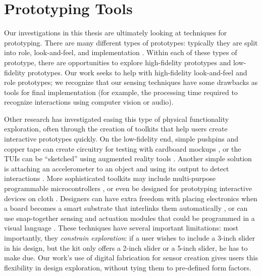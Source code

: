 \section{Prototyping Tools}

    Our investigations in this thesis are ultimately looking at techniques for prototyping. There are many different types of prototypes: typically they are split into role, look-and-feel, and implementation \cite{houde-prototypes}. Within each of these types of prototype, there are opportunities to explore high-fidelity prototypes and low-fidelity prototypes. Our work seeks to help with high-fidelity look-and-feel and role prototypes; we recognize that our sensing techniques have some drawbacks as tools for final implementation (for example, the processing time required to recognize interactions using computer vision or audio).

    Other research has investigated easing this type of physical functionality exploration, often through the creation of toolkits that help users create interactive prototypes quickly. On the low-fidelity end, simple pushpins and copper tape can create circuitry for testing with cardboard mockups \cite{hudson-boxes}, or the TUIs can be ``sketched'' using augmented reality tools \cite{nam-sketchingtuis}. Another simple solution is attaching an accelerometer to an object and using its output to detect interactions \cite{hook-making}. More sophisticated toolkits may include multi-purpose programmable microcontrollers \cite{arduino}, or even be designed for prototyping interactive devices on cloth \cite{buechley-lilypad}. Designers can have extra freedom with placing electronics when a board becomes a smart substrate that interlinks them automatically \cite{villar-voodooio}, or can use snap-together sensing and actuation modules \cite{avrahami-switcharoo, greenberg-phidgets, lee-calder} that could be programmed in a visual language \cite{villar-gadgeteer}. These techniques have several important limitations: most importantly, they \emph{constrain exploration}: if a user wishes to include a 3-inch slider in his design, but the kit only offers a 2-inch slider or a 5-inch slider, he has to make due. Our work's use of digital fabrication for sensor creation gives users this flexibility in design exploration, without tying them to pre-defined form factors.

